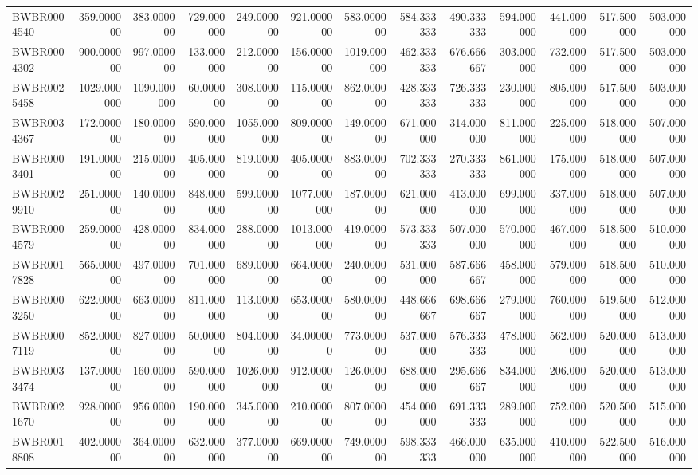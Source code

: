 \begin{longtable}{lrrrrrrrrrrrr}
BWBR0004540 & 359.000000 & 383.000000 & 729.000000 & 249.000000 & 921.000000 & 583.000000 & 584.333333 & 490.333333 & 594.000000 & 441.000000 & 517.500000 & 503.000000 \\
BWBR0004302 & 900.000000 & 997.000000 & 133.000000 & 212.000000 & 156.000000 & 1019.000000 & 462.333333 & 676.666667 & 303.000000 & 732.000000 & 517.500000 & 503.000000 \\
BWBR0025458 & 1029.000000 & 1090.000000 & 60.000000 & 308.000000 & 115.000000 & 862.000000 & 428.333333 & 726.333333 & 230.000000 & 805.000000 & 517.500000 & 503.000000 \\
BWBR0034367 & 172.000000 & 180.000000 & 590.000000 & 1055.000000 & 809.000000 & 149.000000 & 671.000000 & 314.000000 & 811.000000 & 225.000000 & 518.000000 & 507.000000 \\
BWBR0003401 & 191.000000 & 215.000000 & 405.000000 & 819.000000 & 405.000000 & 883.000000 & 702.333333 & 270.333333 & 861.000000 & 175.000000 & 518.000000 & 507.000000 \\
BWBR0029910 & 251.000000 & 140.000000 & 848.000000 & 599.000000 & 1077.000000 & 187.000000 & 621.000000 & 413.000000 & 699.000000 & 337.000000 & 518.000000 & 507.000000 \\
BWBR0004579 & 259.000000 & 428.000000 & 834.000000 & 288.000000 & 1013.000000 & 419.000000 & 573.333333 & 507.000000 & 570.000000 & 467.000000 & 518.500000 & 510.000000 \\
BWBR0017828 & 565.000000 & 497.000000 & 701.000000 & 689.000000 & 664.000000 & 240.000000 & 531.000000 & 587.666667 & 458.000000 & 579.000000 & 518.500000 & 510.000000 \\
BWBR0003250 & 622.000000 & 663.000000 & 811.000000 & 113.000000 & 653.000000 & 580.000000 & 448.666667 & 698.666667 & 279.000000 & 760.000000 & 519.500000 & 512.000000 \\
BWBR0007119 & 852.000000 & 827.000000 & 50.000000 & 804.000000 & 34.000000 & 773.000000 & 537.000000 & 576.333333 & 478.000000 & 562.000000 & 520.000000 & 513.000000 \\
BWBR0033474 & 137.000000 & 160.000000 & 590.000000 & 1026.000000 & 912.000000 & 126.000000 & 688.000000 & 295.666667 & 834.000000 & 206.000000 & 520.000000 & 513.000000 \\
BWBR0021670 & 928.000000 & 956.000000 & 190.000000 & 345.000000 & 210.000000 & 807.000000 & 454.000000 & 691.333333 & 289.000000 & 752.000000 & 520.500000 & 515.000000 \\
BWBR0018808 & 402.000000 & 364.000000 & 632.000000 & 377.000000 & 669.000000 & 749.000000 & 598.333333 & 466.000000 & 635.000000 & 410.000000 & 522.500000 & 516.000000 \\

\end{longtable}
